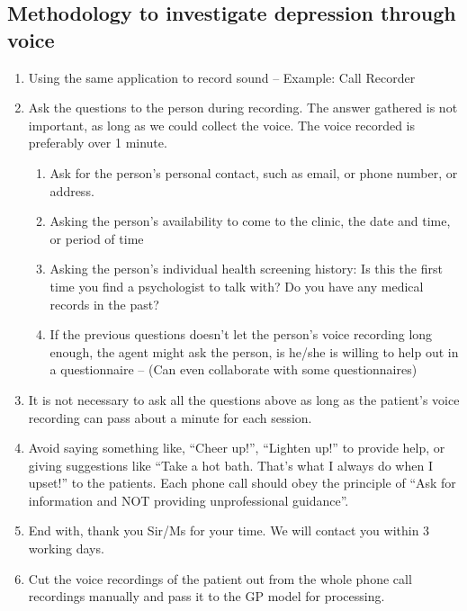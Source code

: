 \documentclass{article}
\begin{document}
	\subsection{Methodology to investigate depression through voice}
    \begin{enumerate}
		\item Using the same application to record sound – Example: Call Recorder
		\item Ask the questions to the person during recording. The answer gathered is not important, as long as we could collect the voice. The voice recorded is preferably over 1 minute.
        \begin{enumerate}
            \item Ask for the person’s personal contact, such as email, or phone number, or address.
            \item Asking the person’s availability to come to the clinic, the date and time, or period of time
            \item Asking the person’s individual health screening history: Is this the first time you find a psychologist to talk with? Do you have any medical records in the past?
            \item If the previous questions doesn’t let the person’s voice recording long enough, the agent might ask the person, is he/she is willing to help out in a questionnaire – (Can even collaborate with some questionnaires)
        \end{enumerate}
        \item It is not necessary to ask all the questions above as long as the patient’s voice recording can pass about a minute for each session.
        \item Avoid saying something like, “Cheer up!”, “Lighten up!” to provide help, or giving suggestions like “Take a hot bath. That’s what I always do when I upset!” to the patients. Each phone call should obey the principle of “Ask for information and NOT providing unprofessional guidance”. \cite{PCS16}
        \item End with, thank you Sir/Ms for your time. We will contact you within 3 working days.
        \item Cut the voice recordings of the patient out from the whole phone call recordings manually and pass it to the GP model for processing.
	\end{enumerate}
\end{document}
